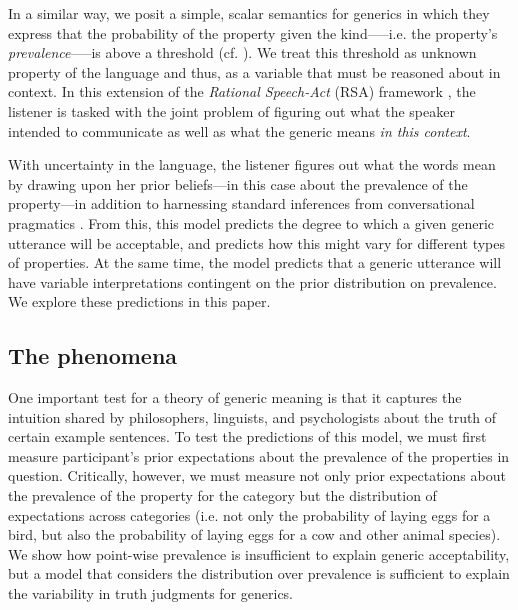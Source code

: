 \documentclass[10pt,letterpaper]{article}
\begin{document}

In a similar way, we posit a simple, scalar semantics for generics in which they express that the probability of the property given the kind-----i.e. the property's \emph{prevalence}-----is above a threshold (cf. ). We treat this threshold as unknown property of the language and thus, as a variable that must be reasoned about in context. In this extension of the \emph{Rational Speech-Act} (RSA) framework \cite{Frank2012,Goodman2013}, the listener is tasked with the joint problem of figuring out what the speaker intended to communicate as well as what the generic means \emph{in this context}. 

With uncertainty in the language, the listener figures out what the words mean by drawing upon her prior beliefs---in this case about the prevalence of the property---in addition to harnessing standard inferences from conversational pragmatics \cite{Clark1996, Grice1975, Levinson2000}. From this, this model predicts the degree to which a given generic utterance will be acceptable, and predicts how this might vary for different types of properties. At the same time, the model predicts that a generic utterance will have variable interpretations contingent on the prior distribution on prevalence. We explore these predictions in this paper.
%
\subsection{The phenomena}

One important test for a theory of generic meaning is that it captures the intuition shared by philosophers, linguists, and psychologists about the truth of certain example sentences. To test the predictions of this model, we must first measure participant's prior expectations about the prevalence of the properties in question. Critically, however, we must measure not only prior expectations about the prevalence of the property for the category but the distribution of expectations across categories (i.e. not only the probability of laying eggs for a bird, but also the probability of laying eggs for a cow and other animal species).  We show how point-wise prevalence is insufficient to explain generic acceptability, but a model that considers the distribution over prevalence is sufficient to explain the variability in truth judgments for generics.
\end{document}
